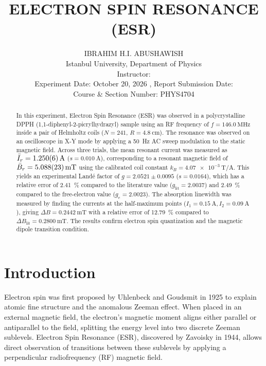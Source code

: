\documentclass[journal]{IEEEtran}
\begin{document}
\title{ELECTRON SPIN RESONANCE (ESR)}
\author{IBRAHIM H.I. ABUSHAWISH \\
Istanbul University, Department of Physics \\
Instructor: \\
Experiment Date: October 20, 2026 , Report Submission Date: \\
Course \& Section Number: PHYS4704}


\maketitle

\begin{abstract}
In this experiment, Electron Spin Resonance (ESR) was observed in a polycrystalline DPPH (1,1-diphenyl-2-picrylhydrazyl) sample using an RF frequency of $f = \SI{146.0}{\mega\hertz}$ inside a pair of Helmholtz coils ($N = 241$, $R = \SI{4.8}{\centi\meter}$). The resonance was observed on an oscilloscope in X-Y mode by applying a \SI{50}{\hertz} AC sweep modulation to the static magnetic field. Across three trials, the mean resonant current was measured as $\bar{I}_r = \SI{1.250 \pm 0.006}{\ampere}$ ($s = \SI{0.010}{\ampere}$), corresponding to a resonant magnetic field of $\bar{B}_r = \SI{5.088 \pm 0.023}{\milli\tesla}$ using the calibrated coil constant $k_B = \SI{4.07e-3}{\tesla\per\ampere}$. This yields an experimental Land\'e factor of $g = 2.0521 \pm 0.0095$ ($s = 0.0164$), which has a relative error of \SI{2.41}{\percent} compared to the literature value ($g_{\text{lit}} = 2.0037$) and \SI{2.49}{\percent} compared to the free-electron value ($g_e = 2.0023$). The absorption linewidth was measured by finding the currents at the half-maximum points ($I_1 = \SI{0.15}{\ampere}, I_2 = \SI{0.09}{\ampere}$), giving $\Delta B = \SI{0.2442}{\milli\tesla}$ with a relative error of \SI{12.79}{\percent} compared to $\Delta B_{\text{lit}} = \SI{0.2800}{\milli\tesla}$. The results confirm electron spin quantization and the magnetic dipole transition condition.
\end{abstract}

\section{Introduction}
Electron spin was first proposed by Uhlenbeck and Goudsmit in 1925 to explain atomic fine structure and the anomalous Zeeman effect. When placed in an external magnetic field, the electron's magnetic moment aligns either parallel or antiparallel to the field, splitting the energy level into two discrete Zeeman sublevels. Electron Spin Resonance (ESR), discovered by Zavoisky in 1944, allows direct observation of transitions between these sublevels by applying a perpendicular radiofrequency (RF) magnetic field.
\end{document}
